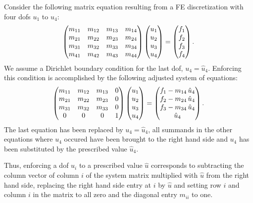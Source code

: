 Consider the following matrix equation resulting from a FE discretization with four dofs $u_1$ to $u_4$:
\begin{equation*}
  \begin{array}{llll}
    \left(\begin{matrix}m_{11} & m_{12} & m_{13} & m_{14} \\ m_{21} & m_{22} & m_{23} & m_{24} 
       \\ m_{31} & m_{32} & m_{33} & m_{34} \\ m_{41} & m_{42} & m_{43} & m_{44} \end{matrix}\right)
    \left(\begin{matrix}u_1 \\ u_2 \\ u_3 \\ u_4\end{matrix}\right) = \left(\begin{matrix}f_1 \\ f_2 \\ f_3 \\ f_4\end{matrix}\right).
  \end{array}
\end{equation*}
We assume a Dirichlet boundary condition for the last dof, $u_4 = \hat{u}_4$. Enforcing this condition is accomplished by the following adjusted system of equations:
\begin{equation*}
  \begin{array}{llll}
    \left(\begin{matrix}m_{11} & m_{12} & m_{13} & 0\\ m_{21} & m_{22} & m_{23} & 0 \\ m_{31} & m_{32} & m_{33} & 0 \\ 0 & 0 & 0 & 1\end{matrix}\right)
    \left(\begin{matrix}u_1 \\ u_2 \\ u_3 \\ u_4\end{matrix}\right) 
    = \left(\begin{matrix}f_1 - m_{14}\,\hat{u}_4 \\
           f_2 - m_{24}\,\hat{u}_4  \\ 
           f_3 - m_{34}\,\hat{u}_4 \\
          \hat{u}_4\end{matrix}\right).
  \end{array}
\end{equation*}
The last equation has been replaced by $u_4 = \hat{u}_4$, all summands in the other equations where $u_4$ occured have been brought to the right hand side and $u_4$ has been substituted by the prescribed value $\hat{u}_4$.

Thus, enforcing a dof $u_i$ to a prescribed value $\hat{u}$ corresponds to 
subtracting the column vector of column $i$ of the system matrix multiplied with $\hat{u}$ from the right hand side, replacing the right hand side entry at $i$ by $\hat{u}$ and setting row $i$ and column $i$ in the matrix to all zero and the diagonal entry $m_{ii}$ to one.

